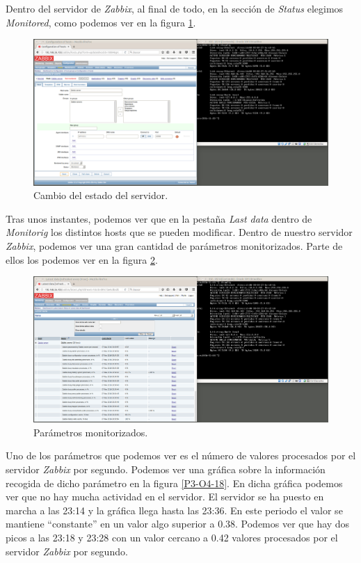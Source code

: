 \documentclass[a4paper,titlepage,12pt]{report}	%
\numberwithin{figure}{section} %
\numberwithin{table}{section} %
\begin{document}
	Dentro del servidor de \textit{Zabbix}, al final de todo, en la sección de \textit{Status} elegimos \textit{Monitored}, como podemos ver en la figura \ref{P3-O4-16}.

	\begin{figure}[H]
	   \includegraphics[width=\linewidth]{./Imagenes/P3/O4-16.png}
	   \vspace{-0.5cm}
	   \caption[Cambio del estado del servidor.]{Cambio del estado del servidor.}
	   \label{P3-O4-16}
	\end{figure}

	Tras unos instantes, podemos ver que en la pestaña \textit{Last data} dentro de \textit{Monitorig} los distintos hosts que se pueden modificar. Dentro de nuestro servidor \textit{Zabbix}, podemos ver una gran cantidad de parámetros monitorizados. Parte de ellos los podemos ver en la figura \ref{P3-O4-17}.

	\begin{figure}[H]
	   \includegraphics[width=\linewidth]{./Imagenes/P3/O4-17.png}
	   \vspace{-0.5cm}
	   \caption[Parámetros monitorizados.]{Parámetros monitorizados.}
	   \label{P3-O4-17}
	\end{figure}

	Uno de los parámetros que podemos ver es el número de valores procesados por el servidor \textit{Zabbix} por segundo. Podemos ver una gráfica sobre la información recogida de dicho parámetro en la figura \ref{P3-O4-18}. En dicha gráfica podemos ver que no hay mucha actividad en el servidor. El servidor se ha puesto en marcha a las 23:14 y la gráfica llega hasta las 23:36. En este periodo el valor se mantiene ``constante'' en un valor algo superior a 0.38. Podemos ver que hay dos picos a las 23:18 y 23:28 con un valor cercano a 0.42 valores procesados por el servidor \textit{Zabbix} por segundo.
\end{document}
